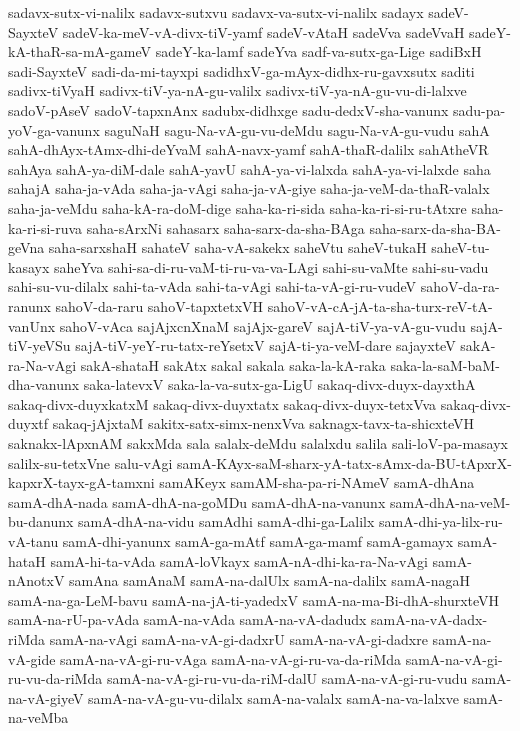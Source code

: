 {sadavx-sutx-vi-nalilx
sadavx-sutxvu
sadavx-va-sutx-vi-nalilx
sadayx
sadeV-SayxteV
sadeV-ka-meV-vA-divx-tiV-yamf
sadeV-vAtaH
sadeVva
sadeVvaH
sadeY-kA-thaR-sa-mA-gameV
sadeY-ka-lamf
sadeYva
sadf-va-sutx-ga-Lige
sadiBxH
sadi-SayxteV
sadi-da-mi-tayxpi
sadidhxV-ga-mAyx-didhx-ru-gavxsutx
saditi
sadivx-tiVyaH
sadivx-tiV-ya-nA-gu-valilx
sadivx-tiV-ya-nA-gu-vu-di-lalxve
sadoV-pAseV
sadoV-tapxnAnx
sadubx-didhxge
sadu-dedxV-sha-vanunx
sadu-pa-yoV-ga-vanunx
saguNaH
sagu-Na-vA-gu-vu-deMdu
sagu-Na-vA-gu-vudu
sahA
sahA-dhAyx-tAmx-dhi-deYvaM
sahA-navx-yamf
sahA-thaR-dalilx
sahAtheVR
sahAya
sahA-ya-diM-dale
sahA-yavU
sahA-ya-vi-lalxda
sahA-ya-vi-lalxde
saha
sahajA
saha-ja-vAda
saha-ja-vAgi
saha-ja-vA-giye
saha-ja-veM-da-thaR-valalx
saha-ja-veMdu
saha-kA-ra-doM-dige
saha-ka-ri-sida
saha-ka-ri-si-ru-tAtxre
saha-ka-ri-si-ruva
saha-sArxNi
sahasarx
saha-sarx-da-sha-BAga
saha-sarx-da-sha-BA-geVna
saha-sarxshaH
sahateV
saha-vA-sakekx
saheVtu
saheV-tukaH
saheV-tu-kasayx
saheYva
sahi-sa-di-ru-vaM-ti-ru-va-va-LAgi
sahi-su-vaMte
sahi-su-vadu
sahi-su-vu-dilalx
sahi-ta-vAda
sahi-ta-vAgi
sahi-ta-vA-gi-ru-vudeV
sahoV-da-ra-ranunx
sahoV-da-raru
sahoV-tapxtetxVH
sahoV-vA-cA-jA-ta-sha-turx-reV-tA-vanUnx
sahoV-vAca
sajAjxcnXnaM
sajAjx-gareV
sajA-tiV-ya-vA-gu-vudu
sajA-tiV-yeVSu
sajA-tiV-yeY-ru-tatx-reYsetxV
sajA-ti-ya-veM-dare
sajayxteV
sakA-ra-Na-vAgi
sakA-shataH
sakAtx
sakal
sakala
saka-la-kA-raka
saka-la-saM-baM-dha-vanunx
saka-latevxV
saka-la-va-sutx-ga-LigU
sakaq-divx-duyx-dayxthA
sakaq-divx-duyxkatxM
sakaq-divx-duyxtatx
sakaq-divx-duyx-tetxVva
sakaq-divx-duyxtf
sakaq-jAjxtaM
sakitx-satx-simx-nenxVva
saknagx-tavx-ta-shicxteVH
saknakx-lApxnAM
sakxMda
sala
salalx-deMdu
salalxdu
salila
sali-loV-pa-masayx
salilx-su-tetxVne
salu-vAgi
samA-KAyx-saM-sharx-yA-tatx-sAmx-da-BU-tApxrX-kapxrX-tayx-gA-tamxni
samAKeyx
samAM-sha-pa-ri-NAmeV
samA-dhAna
samA-dhA-nada
samA-dhA-na-goMDu
samA-dhA-na-vanunx
samA-dhA-na-veM-bu-danunx
samA-dhA-na-vidu
samAdhi
samA-dhi-ga-Lalilx
samA-dhi-ya-lilx-ru-vA-tanu
samA-dhi-yanunx
samA-ga-mAtf
samA-ga-mamf
samA-gamayx
samA-hataH
samA-hi-ta-vAda
samA-loVkayx
samA-nA-dhi-ka-ra-Na-vAgi
samA-nAnotxV
samAna
samAnaM
samA-na-dalUlx
samA-na-dalilx
samA-nagaH
samA-na-ga-LeM-bavu
samA-na-jA-ti-yadedxV
samA-na-ma-Bi-dhA-shurxteVH
samA-na-rU-pa-vAda
samA-na-vAda
samA-na-vA-dadudx
samA-na-vA-dadx-riMda
samA-na-vAgi
samA-na-vA-gi-dadxrU
samA-na-vA-gi-dadxre
samA-na-vA-gide
samA-na-vA-gi-ru-vAga
samA-na-vA-gi-ru-va-da-riMda
samA-na-vA-gi-ru-vu-da-riMda
samA-na-vA-gi-ru-vu-da-riM-dalU
samA-na-vA-gi-ru-vudu
samA-na-vA-giyeV
samA-na-vA-gu-vu-dilalx
samA-na-valalx
samA-na-va-lalxve
samA-na-veMba
}
